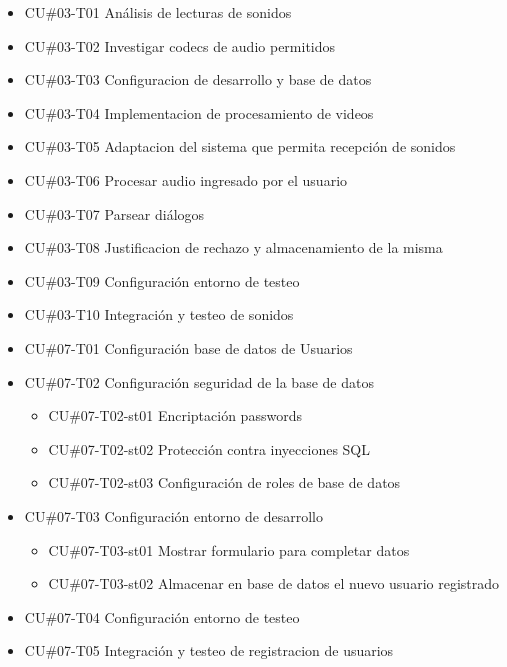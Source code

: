 \begin{itemize}
    \item CU\#03-T01 Análisis de lecturas de sonidos
    \item CU\#03-T02 Investigar codecs de audio permitidos
    \item CU\#03-T03 Configuracion de desarrollo y base de datos
    \item CU\#03-T04 Implementacion de procesamiento de videos
    \item CU\#03-T05 Adaptacion del sistema que permita recepción de sonidos
    \item CU\#03-T06 Procesar audio ingresado por el usuario
    \item CU\#03-T07 Parsear diálogos
    \item CU\#03-T08 Justificacion de rechazo y almacenamiento de la misma
    \item CU\#03-T09 Configuración entorno de testeo
    \item CU\#03-T10 Integración y testeo de sonidos                      
\end{itemize}


\begin{itemize}
    \item CU\#07-T01 Configuración base de datos de Usuarios
    \item CU\#07-T02 Configuración seguridad de la base de datos
    \begin{itemize}
        \item CU\#07-T02-st01 Encriptación passwords
        \item CU\#07-T02-st02 Protección contra inyecciones SQL
        \item CU\#07-T02-st03 Configuración de roles de base de datos
    \end{itemize}
    \item CU\#07-T03 Configuración entorno de desarrollo
    \begin{itemize}
        \item CU\#07-T03-st01 Mostrar formulario para completar datos
        \item CU\#07-T03-st02 Almacenar en base de datos el nuevo usuario registrado
    \end{itemize}
    \item CU\#07-T04 Configuración entorno de testeo
    \item CU\#07-T05 Integración y testeo de registracion de usuarios
\end{itemize}

